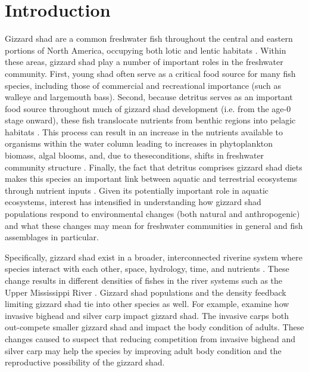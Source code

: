 \documentclass[preprint,review,12pt,authoryear]{elsarticle}
\begin{document}
\section{Introduction}
Gizzard shad are a common freshwater fish throughout the central and eastern portions of North America, occupying both lotic and lentic habitats \citep{pierce1981aspects,vanni2005linking}. 
Within these areas, gizzard shad play a number of important roles in the freshwater community. 
First, young shad often serve as a critical food source for many fish species, including those of commercial and recreational importance (such as walleye and largemouth bass)\citep{jester1972life}. 
Second, because detritus serves as an important food source throughout much of gizzard shad development (i.e. from the age-0 stage onward), these fish translocate nutrients
from benthic regions into pelagic habitats \citep{mather1995regeneration, schaus2000effects, vanni2005linking}. 
This process can result in an increase in the nutrients available to organisms within the water column leading to increases in phytoplankton biomass, algal blooms, and, due to theseconditions, shifts in freshwater community structure \citep{aday2003direct, schaus2000effects}. 
Finally, the fact that detritus comprises gizzard shad diets makes this species an important link between aquatic and terrestrial ecosystems through nutrient inputs \citep{schaus2000effects}.
Given its potentially important role in aquatic ecosystems, interest has intensified in understanding how gizzard shad populations respond to environmental changes (both natural and anthropogenic) and what these changes may mean for freshwater communities in general and fish assemblages in particular.

Specifically, gizzard shad exist in a broader, interconnected riverine system where species interact with each other, space, hydrology, time, and nutrients \citep{thorp2006riverine}. 
These change results in different densities of fishes in the river systems such as the Upper Mississippi River \citep{holland1986distribution}.
Gizzard shad populations and the density feedback limiting gizzard shad tie into other species as well.
For example, \citet{love2018does} examine how invasive bighead and silver carp impact gizzard shad.
The invasive carps both out-compete smaller gizzard shad and impact the body condition of adults.
These changes caused \citet{love2018does} to suspect that reducing competition from invasive bighead and silver carp may help the species by improving adult body condition and the reproductive possibility of the gizzard shad.
\end{document}
